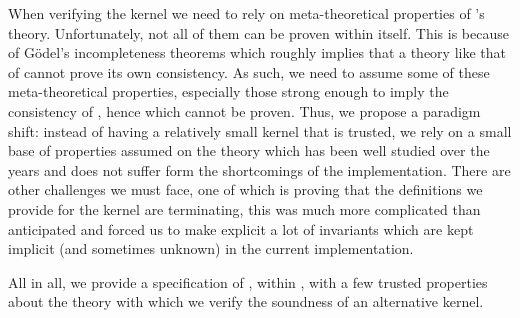 When verifying the kernel we need to rely on meta-theoretical properties of
\Coq's theory. Unfortunately, not all of them can be proven within \Coq itself.
%
This is because of Gödel's incompleteness theorems which roughly implies that a
theory like that of \Coq cannot prove its own consistency. As such, we need to
assume some of these meta-theoretical properties, especially those strong enough
to imply the consistency of \Coq, hence which cannot be proven.
Thus, we propose a paradigm shift: instead of having a relatively small kernel
that is trusted, we rely on a small base of properties assumed on the theory
which has been well studied over the years and does not suffer form the
shortcomings of the implementation.
There are other challenges we must face, one of which is proving that the
definitions we provide for the kernel are terminating, this was much more
complicated than anticipated and forced us to make explicit a lot of invariants
which are kept implicit (and sometimes unknown) in the current implementation.

All in all, we provide a specification of \Coq, within \Coq, with a few trusted
properties about the theory with which we verify the soundness of an alternative
\Coq kernel.
